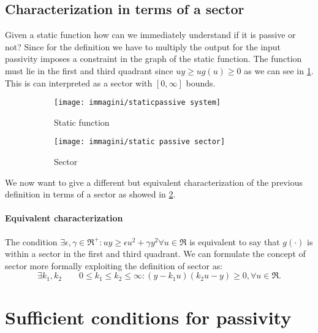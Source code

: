 \subsection{Characterization in terms of a sector}
Given a static function how can we immediately understand if it is passive or not? Since for the definition we have to multiply the output for the input passivity imposes a constraint in the graph of the static function. The function must lie in the first and third quadrant since $uy\ge ug(u)\ge 0$ as we can see in \ref{fig:sfunc}. This is can interpreted as a sector with $[0,\infty]$ bounds.
\begin{figure}[H]
	\centering
	\begin{subfigure}[b]{0.3\textwidth}
		\centering
		\texttt{[image: immagini/staticpassive system]}
		\caption{Static function}
		\label{fig:sfunc}
	\end{subfigure}
	\hfill
	\begin{subfigure}[b]{0.3\textwidth}
		\centering
		\texttt{[image: immagini/static passive sector]}
		\caption{Sector}
		\label{fig:sectpass}
	\end{subfigure}
	\hfill
	\label{fig:staticpass}
	\caption[]{}
\end{figure}
We now want to give a different but equivalent characterization of the previous definition in terms of a sector as showed in \ref{fig:sectpass}.
\paragraph{Equivalent characterization} The condition $\exists  \epsilon,\gamma\in \Re^+\colon uy \ge \epsilon u^2+\gamma y^2 \forall u \in \Re$ is equivalent to say that $g(\cdot)$ is within a sector in the first and third quadrant. We can formulate the concept of sector more formally exploiting the definition of sector as:
\[
\exists k_1,k_2 \qquad 0\le k_1\le k_2 \le \infty \colon (y-k_1u)(k_2u-y)\ge0, \forall u \in \Re.
\]
\section{Sufficient conditions for passivity}

